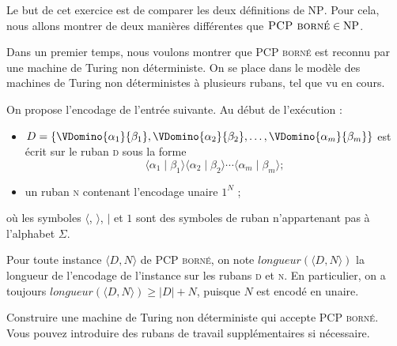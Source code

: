 \begin{exercice}
  Le but de cet exercice est de comparer les deux définitions de $\text{NP}$.
  Pour cela, nous allons montrer de deux manières différentes que $\textsc{PCP borné} \in \text{NP}$.

  Dans un premier temps, nous voulons montrer que \textsc{PCP borné} est reconnu par une machine de Turing non déterministe.
  On se place dans le modèle des machines de Turing non déterministes à plusieurs rubans, tel que vu en cours.
  
  On propose l'encodage de l'entrée suivante. Au début de l'exécution :
  \begin{itemize}
  \item $D = \left\{ \VDomino{\alpha_1}{\beta_1}, \VDomino{\alpha_2}{\beta_2}, \ldots, \VDomino{\alpha_m}{\beta_m}\right\}$ est écrit sur le ruban \textsc{d} sous la forme 
    $$
    \langle \alpha_1 \mid \beta_1 \rangle \langle \alpha_2 \mid \beta_2 \rangle \cdots \langle \alpha_m \mid \beta_m \rangle ;
    $$
  \item un ruban \textsc{n} contenant l'encodage unaire $1^N$ ;
  \end{itemize}
  où les symboles $\langle$, $\rangle$, $\mid$ et $1$ sont des symboles de ruban n'appartenant pas à l'alphabet $\Sigma$.

  Pour toute instance $\langle D, N \rangle$ de \textsc{PCP borné}, on note $\mathit{longueur}(\langle D, N \rangle)$
  la longueur de l'encodage de l'instance sur les rubans \textsc{d} et \textsc{n}. En particulier,
  on a toujours $\mathit{longueur}(\langle D, N \rangle) \ge |D| + N$, puisque $N$ est encodé en unaire.
  
  \ifcorrection{\newpage}
  \begin{questions}
  \item Construire une machine de Turing non déterministe qui accepte \textsc{PCP borné}.
    Vous pouvez introduire des rubans de travail supplémentaires si nécessaire. 
  \end{questions}
  \begin{corrections}
\end{corrections}
\end{exercice}
